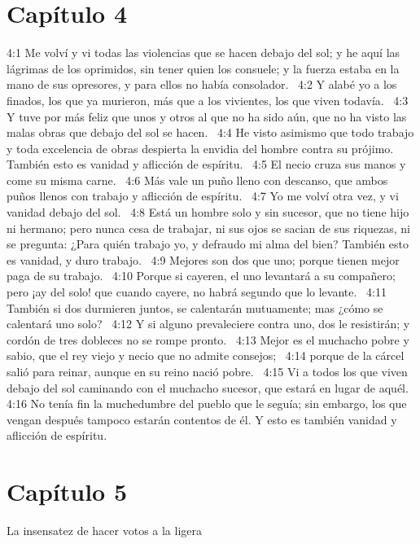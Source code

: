 \section*{Capítulo 4 }

4:1 Me volví y vi todas las violencias que se hacen debajo del sol; y he aquí las lágrimas de los oprimidos, sin tener quien los consuele; y la fuerza estaba en la mano de sus opresores, y para ellos no había consolador.  
4:2 Y alabé yo a los finados, los que ya murieron, más que a los vivientes, los que viven todavía.  
4:3 Y tuve por más feliz que unos y otros al que no ha sido aún, que no ha visto las malas obras que debajo del sol se hacen.  
4:4 He visto asimismo que todo trabajo y toda excelencia de obras despierta la envidia del hombre contra su prójimo. También esto es vanidad y aflicción de espíritu.  
4:5 El necio cruza sus manos y come su misma carne.  
4:6 Más vale un puño lleno con descanso, que ambos puños llenos con trabajo y aflicción de espíritu.  
4:7 Yo me volví otra vez, y vi vanidad debajo del sol.  
4:8 Está un hombre solo y sin sucesor, que no tiene hijo ni hermano; pero nunca cesa de trabajar, ni sus ojos se sacian de sus riquezas, ni se pregunta: ¿Para quién trabajo yo, y defraudo mi alma del bien? También esto es vanidad, y duro trabajo.  
4:9 Mejores son dos que uno; porque tienen mejor paga de su trabajo.  
4:10 Porque si cayeren, el uno levantará a su compañero; pero ¡ay del solo! que cuando cayere, no habrá segundo que lo levante.  
4:11 También si dos durmieren juntos, se calentarán mutuamente; mas ¿cómo se calentará uno solo?  
4:12 Y si alguno prevaleciere contra uno, dos le resistirán; y cordón de tres dobleces no se rompe pronto.  
4:13 Mejor es el muchacho pobre y sabio, que el rey viejo y necio que no admite consejos;  
4:14 porque de la cárcel salió para reinar, aunque en su reino nació pobre.  
4:15 Vi a todos los que viven debajo del sol caminando con el muchacho sucesor, que estará en lugar de aquél.  
4:16 No tenía fin la muchedumbre del pueblo que le seguía; sin embargo, los que vengan después tampoco estarán contentos de él. Y esto es también vanidad y aflicción de espíritu.  
\section*{Capítulo 5}
La insensatez de hacer votos a la ligera  

